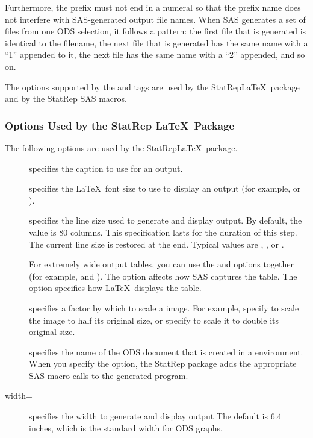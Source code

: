 \documentclass[article,oneside]{memoir}
\newcommand*{\StatRep}{\textsf{StatRep}\xspace}
\begin{document}
     Furthermore, the prefix must not end in a numeral so that the prefix name does not interfere
     with SAS-generated output file names.
    When SAS generates a set of files from one ODS selection, it follows a
    pattern: the first file that is generated is identical to the filename, the next
    file that is generated has the same name with a ``1'' appended to it, the next file
    has the same name with a ``2'' appended, and so on.

     The options supported by the  and  tags are used by
     the \StatRep \LaTeX\ package and by the \StatRep SAS macros.

     \subsubsection{Options Used by the \textsf{StatRep} \LaTeX\ Package}

  The following options are used by the \StatRep \LaTeX\ package.
  \begin{description}
     \item[] specifies the caption to use for an output.

     \item[] specifies the \LaTeX\ font size to use to display an output
    (for example,  or ).

     \item[] specifies the line size used to generate and display
      output. By default, the value is 80 columns.
     This specification lasts for the duration of this step. The current line size is
     restored at the end.
     Typical values are , , or .

     For extremely wide output tables, you can use the  and 
     options together (for example,  and ).
     The  option affects how SAS captures the table. The 
     option specifies how \LaTeX\ displays the table.%

     \item[] specifies a factor by which to scale a  image.
     For example, specify  to scale the image to half its original size,
     or specify  to scale it to double its original size.

    \item[] specifies the name of the ODS document that is created in a
      environment. When you specify the  option,
     the \StatRep package adds the appropriate SAS macro calls to the
     generated program.

     \item[width=] specifies the width to generate and display  output
           The default is 6.4 inches, which is the standard width for ODS graphs.

  \end{description}
\end{document}
